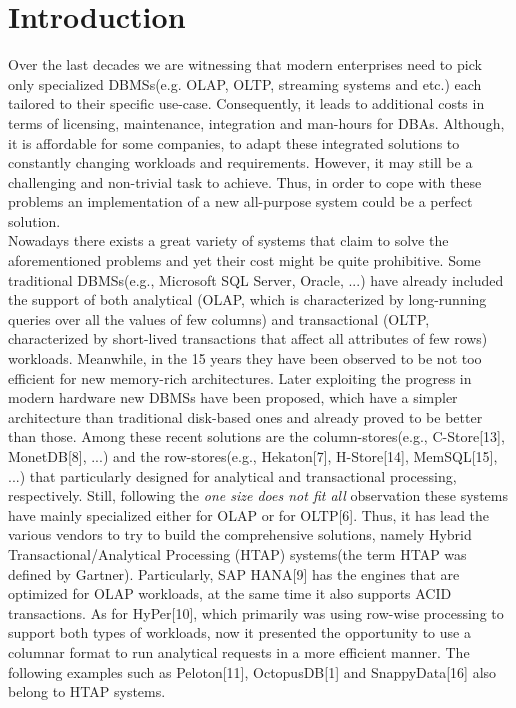 \documentclass[10pt, conference, compsocconf]{IEEEtran}
\begin{document}
\section{Introduction}
Over the last decades we are witnessing that modern enterprises need to pick only  specialized DBMSs(e.g. OLAP, OLTP, streaming systems and etc.) each tailored to their specific use-case. Consequently, it leads to additional costs in terms of licensing, maintenance, integration and man-hours for DBAs. Although, it is affordable for some companies, to adapt these integrated solutions to constantly changing workloads and requirements. However, it may still be a challenging and non-trivial task to achieve. Thus, in order to cope with these problems an implementation of a new all-purpose system could be a perfect solution. \\ Nowadays there exists a great variety of systems that claim to solve the aforementioned problems and yet their cost might be quite prohibitive. Some traditional DBMSs(e.g., Microsoft SQL Server, Oracle, ...) have already included the support of both analytical (OLAP, which is characterized by long-running queries over all the values of few columns) and transactional (OLTP, characterized by short-lived transactions that affect all attributes of few rows) workloads. Meanwhile, in the 15 years they have been observed to be not too efficient for new memory-rich architectures. Later exploiting the progress in modern hardware new DBMSs have been proposed, which have a simpler architecture than traditional disk-based ones and already proved to be better than those. Among these recent solutions are the column-stores(e.g., C-Store[13], MonetDB[8], ...) and the row-stores(e.g., Hekaton[7], H-Store[14], MemSQL[15], ...) that particularly designed for analytical and transactional processing, respectively. Still, following the \textit{one size does not fit all} observation these systems have mainly specialized either for OLAP or for OLTP[6]. Thus, it has lead the various vendors to try to build the comprehensive solutions, namely Hybrid Transactional/Analytical Processing (HTAP) systems(the term HTAP was defined by Gartner). Particularly, SAP HANA[9] has the engines that are optimized for OLAP workloads, at the same time it also supports ACID transactions. As for HyPer[10], which primarily was using row-wise processing to support both types of workloads, now it presented the opportunity to use a columnar format to run analytical requests in a more efficient manner. The following examples such as Peloton[11], OctopusDB[1] and  SnappyData[16] also belong to HTAP systems.  
\end{document}
